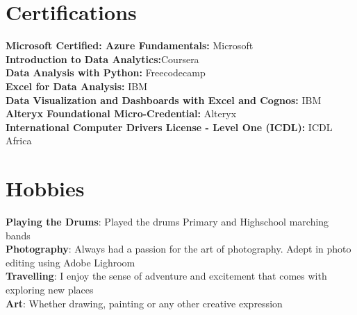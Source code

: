 \documentclass[letterpaper,11pt]{article}
\begin{document}
\section{Certifications}
\begin{itemize}[leftmargin=0.15in, label={}]
    \small{\item{
     \textbf{Microsoft Certified: Azure Fundamentals:}{		Microsoft} \\
     \textbf{Introduction to Data Analytics:}{Coursera} \\
     \textbf{Data Analysis with Python:}{ Freecodecamp} \\
     \textbf{Excel for Data Analysis:}{	IBM} \\
     \textbf{Data Visualization and Dashboards with Excel and Cognos:}{	IBM} \\
     \textbf{Alteryx Foundational Micro-Credential:}{		Alteryx} \\
     \textbf{International Computer Drivers License - Level One (ICDL):}{		ICDL Africa} \\
     
 
     
    }}
 \end{itemize}
 

 
 


\vspace*{0.2cm}
\section{Hobbies}

\begin{itemize}[leftmargin=0.15in, label={}]
    \small{\item{
     \textbf{Playing the Drums}{: Played the drums Primary and Highschool marching bands} \\
     \textbf{Photography}{: Always had a passion for the art of photography. Adept in photo editing using Adobe Lighroom} \\
     \textbf{Travelling}{: I enjoy the sense of adventure and excitement that comes with exploring new places} \\
     \textbf{Art}{: Whether drawing, painting or any other creative expression} \\
    }}
 \end{itemize}
 
\end{document}
